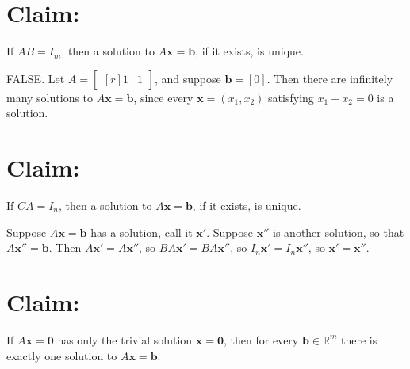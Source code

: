\documentclass[answers,addpoints,12pt]{exam}
\theoremstyle{remark}
\renewcommand{\vec}[1]{\mathbf{#1}}
\newcommand{\<}{\ensuremath{\langle}}
\renewcommand{\>}{\ensuremath{\rangle}}
\newcommand{\R}{\ensuremath{\mathbb{R}}}
\newcommand\vb{\vec{b}}
\newcommand\vx{\vec{x}}
\newcommand\vzero{\vec{0}}
\begin{document}
\begin{questions}
\begin{parts}
   \part[5]
    {\bf Claim:} If $AB = I_m$, then a solution to $A\vx = \vb$, if it exists, is unique.

      \begin{solution} FALSE.  
        Let $A = \begin{bmatrix*}[r] 1 &1 \end{bmatrix*}$, and suppose $\vb = [0]$.
        Then there are infinitely many solutions to $A\vx =\vb$, since every
        $\vx = (x_1, x_2)$ satisfying $x_1 + x_2 = 0$ is a solution. 
      \end{solution}


   \part[5]
    {\bf Claim:} If $CA = I_n$, then a solution to $A\vx = \vb$, if it exists, is unique.

      \begin{solution}
        Suppose $A\vx = \vb$ has a solution, call it $\vx'$.
        Suppose $\vx''$ is another solution, so that $A\vx'' = \vb$. Then 
        $A\vx' = A\vx''$, so
        $BA\vx' = BA\vx''$, so
        $I_n\vx' = I_n\vx''$, so
        $\vx' = \vx''$.
      \end{solution}


    \part[5]
    {\bf Claim:} If $A\vx = \vzero$ has only the trivial solution $\vx = \vzero$, then 
    for every $\vb\in \R^m$ there is exactly one solution to $A\vx = \vb$.


\end{parts}
\end{questions}
\end{document}
